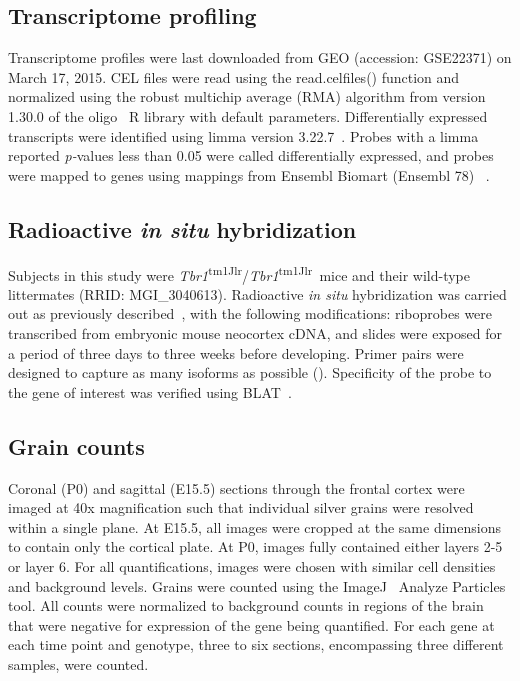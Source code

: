 \subsection{Transcriptome profiling}

Transcriptome profiles were last downloaded from GEO (accession:
GSE22371) on March 17, 2015. CEL files were read using the
read.celfiles() function and normalized using the robust multichip
average (RMA) algorithm from version 1.30.0 of the oligo~\citep{Carvalho:2010bc} R library with default parameters. Differentially
expressed transcripts were identified using limma version 3.22.7~\citep{Ritchie:2015fa}. Probes with a limma reported \emph{p-}values
less than 0.05 were called differentially expressed, and probes were
mapped to genes using mappings from Ensembl Biomart (Ensembl 78) ~\citep{Cunningham:2015ew}.

\subsection{Radioactive \emph{in situ} hybridization}

Subjects in this study were
\emph{Tbr1}\textsuperscript{tm1Jlr}/\emph{Tbr1}\textsuperscript{tm1Jlr}~mice
and their wild-type littermates (RRID: MGI\_3040613). Radioactive
\emph{in situ} hybridization was carried out as previously described~\citep{Frantz:1994tc}, with the following modifications: riboprobes were
transcribed from embryonic mouse neocortex cDNA, and slides were exposed
for a period of three days to three weeks before developing. Primer
pairs were designed to capture as many isoforms as possible
(). Specificity of the probe to the gene of
interest was verified using BLAT~\citep{Kent:2002jd}.

\subsection{Grain counts}

Coronal (P0) and sagittal (E15.5) sections through the frontal cortex
were imaged at 40x magnification such that individual silver grains were
resolved within a single plane. At E15.5, all images were cropped at the
same dimensions to contain only the cortical plate. At P0, images fully
contained either layers 2-5 or layer 6. For all quantifications, images
were chosen with similar cell densities and background levels. Grains
were counted using the ImageJ~\citep{Schneider:2012dw} Analyze Particles
tool. All counts were normalized to background counts in regions of the
brain that were negative for expression of the gene being quantified.
For each gene at each time point and genotype, three to six sections,
encompassing three different samples, were counted.

